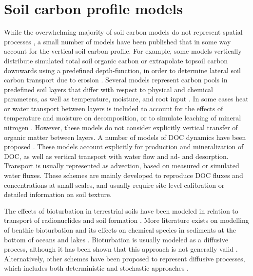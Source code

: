 \documentclass[11pt, oneside, a4paper]{article}   	%
\begin{document}
\section{Soil carbon profile models}
While the overwhelming majority of soil carbon models do not represent spatial processes \citep{Manzoni2009}, a small number of models have been published that in some way account for the
vertical soil carbon profile. For example, some models vertically distribute simulated total soil organic carbon or extrapolate topsoil carbon downwards using a predefined
depth-function, in order to determine lateral soil carbon transport due to erosion
\citep{Rosenbloom2001, Hilinski2001}. Several models represent carbon pools in
predefined soil layers that differ with respect to physical and chemical parameters,
as well as temperature, moisture, and root input \citep{vanVeen1981, Grant1993}. In some cases heat or water transport between layers is included to account for the effects of temperature and moisture on decomposition, or to simulate
leaching of mineral nitrogen \citep{Hansen1991, Li1992}. However, these
models do not consider explicitly vertical transfer of organic matter between layers.
A number of models of DOC dynamics have been
proposed \citep{Michalzik2003, Neff2001, Gjettermann2008, Brovelli2012}. These models account explicitly for production and mineralization of DOC, as well as vertical transport with water flow and ad- and desorption. Transport is usually represented as advection, based on measured or simulated
water fluxes. These schemes are mainly developed to reproduce DOC fluxes and
concentrations at small scales, and usually require site level calibration or detailed
information on soil texture.

The effects of bioturbation in terrestrial soils have been modeled in relation to
transport of radionuclides \citep[e.g.][]{Muller1996, Kaste2007, Bunzl2002} and soil formation \citep{Kirkby1977, Salvador2007}.
More literature exists on modelling of benthic bioturbation and its effects on chemical species in sediments at the bottom of oceans and lakes \citep[e.g.][]{Boudreau1986b, Meysman2005, Meysman2010, Sarmiento2006, Arndt2013}. Bioturbation is usually modeled as a diffusive process, although it has been shown that this approach is not generally valid \citep{Meysman2003, Meysman2010}. Alternatively, other schemes have been proposed to represent diffusive processes, which includes both deterministic \citep{Boudreau1986a, Boudreau1989} and stochastic approaches \citep{Bunzl2002, Choi2002, Meysman2008}.
\end{document}
